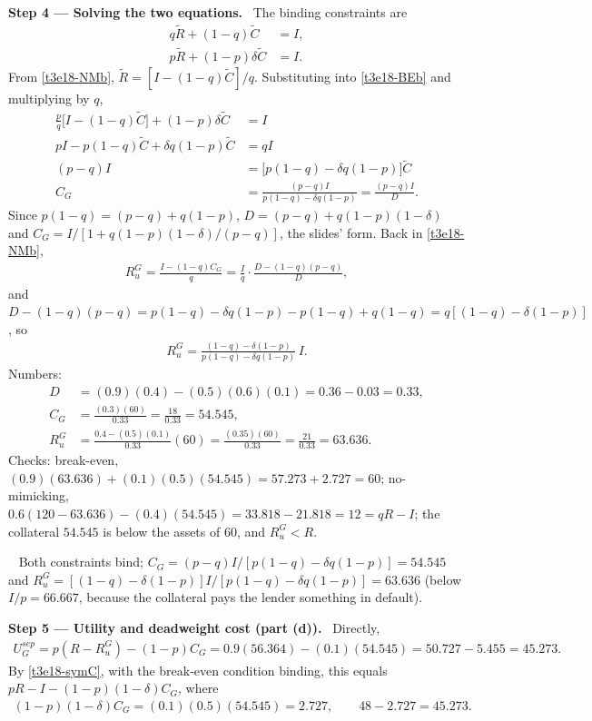 \documentclass[11pt,a4paper]{article}
\newcommand{\step}[2]{\par\medskip\noindent\textbf{Step #1 --- #2.}~}
\newcommand{\answer}[1]{\par\smallskip\noindent\fbox{\textbf{Answer #1.}}~}
\begin{document}
\step{4}{Solving the two equations} The binding constraints are
\begin{align}
  q\tilde R+(1-q)\tilde C &= I, \label{t3e18-NMb}\\
  p\tilde R+(1-p)\delta\tilde C &= I. \label{t3e18-BEb}
\end{align}
From \eqref{t3e18-NMb}, $\tilde R=[I-(1-q)\tilde C]/q$. Substituting into \eqref{t3e18-BEb} and multiplying by $q$,
\begin{align}
  \frac pq\bigl[I-(1-q)\tilde C\bigr]+(1-p)\delta\tilde C &= I \nonumber\\
  pI-p(1-q)\tilde C+\delta q(1-p)\tilde C &= qI \nonumber\\
  (p-q)I &= \bigl[p(1-q)-\delta q(1-p)\bigr]\tilde C \nonumber\\
  C_G &= \frac{(p-q)I}{p(1-q)-\delta q(1-p)} = \frac{(p-q)I}{D}. \label{t3e18-C}
\end{align}
Since $p(1-q)=(p-q)+q(1-p)$, $D=(p-q)+q(1-p)(1-\delta)$ and $C_G=I/[1+q(1-p)(1-\delta)/(p-q)]$, the slides' form. Back in \eqref{t3e18-NMb},
\begin{align}
  R_u^G = \frac{I-(1-q)C_G}{q} = \frac Iq\cdot\frac{D-(1-q)(p-q)}{D}, \nonumber
\end{align}
and $D-(1-q)(p-q)=p(1-q)-\delta q(1-p)-p(1-q)+q(1-q)=q[(1-q)-\delta(1-p)]$, so
\begin{align}
  R_u^G = \frac{(1-q)-\delta(1-p)}{p(1-q)-\delta q(1-p)}\,I. \label{t3e18-R}
\end{align}
Numbers:
\begin{align}
  D &= (0.9)(0.4)-(0.5)(0.6)(0.1) = 0.36-0.03 = 0.33, \nonumber\\
  C_G &= \frac{(0.3)(60)}{0.33} = \frac{18}{0.33} = 54.545, \nonumber\\
  R_u^G &= \frac{0.4-(0.5)(0.1)}{0.33}(60) = \frac{(0.35)(60)}{0.33} = \frac{21}{0.33} = 63.636. \nonumber
\end{align}
Checks: break-even, $(0.9)(63.636)+(0.1)(0.5)(54.545)=57.273+2.727=60$; no-mimicking, $0.6(120-63.636)-(0.4)(54.545)=33.818-21.818=12=qR-I$; the collateral $54.545$ is below the assets of 60, and $R_u^G<R$.

\answer{(c)} Both constraints bind; $C_G=(p-q)I/[p(1-q)-\delta q(1-p)]=54.545$ and $R_u^G=[(1-q)-\delta(1-p)]I/[p(1-q)-\delta q(1-p)]=63.636$ (below $I/p=66.667$, because the collateral pays the lender something in default).

\step{5}{Utility and deadweight cost (part (d))} Directly,
\begin{align}
  U_G^{sep} = p(R-R_u^G)-(1-p)C_G = 0.9(56.364)-(0.1)(54.545) = 50.727-5.455 = 45.273. \nonumber
\end{align}
By \eqref{t3e18-symC}, with the break-even condition binding, this equals $pR-I-(1-p)(1-\delta)C_G$, where
\begin{align}
  (1-p)(1-\delta)C_G = (0.1)(0.5)(54.545) = 2.727, \qquad 48-2.727 = 45.273. \nonumber
\end{align}
\end{document}
